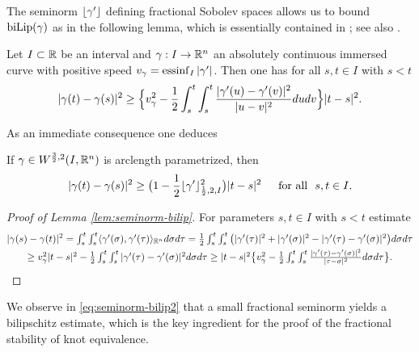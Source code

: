 The seminorm $\lfloor \gamma'\rfloor $ defining fractional Sobolev spaces allows us to bound
$\operatorname{biLip}(\gamma)$ as  in the following lemma, which is essentially contained
in \cite[Lemma 2.1]{blatt_2012a}; see also \cite[Lemma 2.1]{blatt-etal_2024}.


\begin{lemma}\label{lem:seminorm-bilip}
Let $I\subset\mathbb{R}$ be an interval and $\gamma:I\to\mathbb{R}^n$ an absolutely continuous
immersed curve with positive speed $v_\gamma=\operatorname{essinf}_{I}|\gamma'|$. 
Then one has for all $s,t\in I$ with $s<t$
\begin{equation}\label{eq:seminorm-bilip}
|\gamma(t)-\gamma(s)|^2\ge\Big\{v_\gamma^2-\frac12\int_s^t\int_s^t\frac{|\gamma'(u)-\gamma'(v)|^2}{|u-v|^2}dudv\Big\}|t-s|^2.
\end{equation}
\end{lemma}
As an immediate consequence one deduces
\begin{corollary}
\label{cor:seminorm-bilip}
If $\gamma\in W^{\frac32, 2}(I,\mathbb{R}^n)$ is arclength parametrized, then
\begin{equation}\label{eq:seminorm-bilip2}
|\gamma(t)-\gamma(s)|^2\ge\big(1-\frac12 \lfloor\gamma'\rfloor^2_{\frac12,2,I}\big)|t-s|^2\quad\,\,\,\text{for all }\,\,
s,t\in I.
\end{equation}
\end{corollary}
\begin{proof}[Proof of Lemma {\ref{lem:seminorm-bilip}}]
For parameters $s,t\in I$ with $s<t$ estimate
\begin{gather*}
|\gamma(s) -\gamma(t)|^2  
\textstyle
= \int_s^t\int_s^t\langle\gamma'(\sigma),\gamma'(\tau)\rangle_{\mathbb{R}^n}d\sigma 
d\tau
 \textstyle
= \frac12  \int_s^t\int_s^t \big(
|\gamma'(\tau)|^2+
|\gamma'(\sigma)|^2-|\gamma'(\tau)-\gamma'(\sigma)|^2\big)d\sigma d\tau\\
\textstyle
\ge v_\gamma^2|t-s|^2-\frac12\int_s^t\int_s^t|\gamma'(\tau)-\gamma'(\sigma)|^2d\sigma d\tau
\ge\textstyle
|t-s|^2\big\{v_\gamma^2-\frac12\int_s^t\int_s^t
\frac{|\gamma'(\tau)-\gamma'(\sigma)|^2}{|\tau-\sigma|^2}d\sigma d\tau\big\}.\qedhere
\end{gather*}
\end{proof}

We observe in \eqref{eq:seminorm-bilip2} that a small fractional seminorm
yields a bilipschitz  estimate, which is the key ingredient for the proof 
of the fractional stability of knot equivalence.

